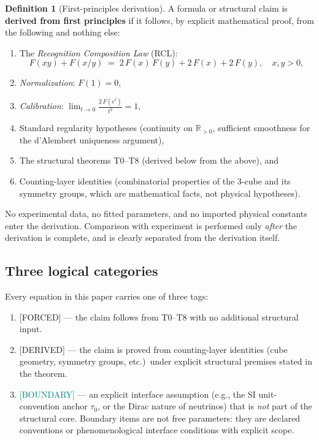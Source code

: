\documentclass[11pt,a4paper]{article}
\theoremstyle{definition}
\newtheorem{definition}[theorem]{Definition}
\theoremstyle{remark}
\newcommand{\DERIVED}{\textcolor{blue!70!black}{\footnotesize\textsf{[DERIVED]}}}
\newcommand{\FORCED}{\textcolor{red!70!black}{\footnotesize\textsf{[FORCED]}}}
\newcommand{\BOUNDARY}{\textcolor{teal}{\footnotesize\textsf{[BOUNDARY]}}}
\begin{document}
\begin{definition}[First-principles derivation]
\label{def:first_principles}
A formula or structural claim is \textbf{derived from first principles} if it
follows, by explicit mathematical proof, from the following and nothing else:
\begin{enumerate}[nosep]
  \item The \emph{Recognition Composition Law} (RCL):
    \begin{equation}
      F(xy) + F(x/y) \;=\; 2\,F(x)\,F(y) + 2\,F(x) + 2\,F(y),
      \quad x, y > 0,
      \label{eq:RCL}
    \end{equation}
  \item \emph{Normalization}: $F(1) = 0$,
  \item \emph{Calibration}: $\displaystyle\lim_{t \to 0}
        \frac{2\,F(e^t)}{t^2} = 1$,
  \item Standard regularity hypotheses (continuity on $\mathbb{R}_{>0}$,
        sufficient smoothness for the d'Alembert uniqueness argument),
  \item The structural theorems T0--T8 (derived below from the above), and
  \item Counting-layer identities (combinatorial properties of the 3-cube and
        its symmetry groups, which are mathematical facts, not physical
        hypotheses).
\end{enumerate}
No experimental data, no fitted parameters, and no imported physical constants
enter the derivation.  Comparison with experiment is performed only
\emph{after} the derivation is complete, and is clearly separated from the
derivation itself.
\end{definition}

\subsection{Three logical categories}

Every equation in this paper carries one of three tags:

\begin{enumerate}[nosep]
  \item \FORCED{} --- the claim follows from T0--T8 with no additional
        structural input.
  \item \DERIVED{} --- the claim is proved from counting-layer identities
        (cube geometry, symmetry groups, etc.)\ under explicit structural
        premises stated in the theorem.
  \item \BOUNDARY{} --- an explicit interface assumption (e.g., the SI
        unit-convention anchor $\tau_0$, or the Dirac nature of neutrinos)
        that is \emph{not} part of the structural core.  Boundary items are
        not free parameters: they are declared conventions or phenomenological
        interface conditions with explicit scope.
\end{enumerate}
\end{document}
